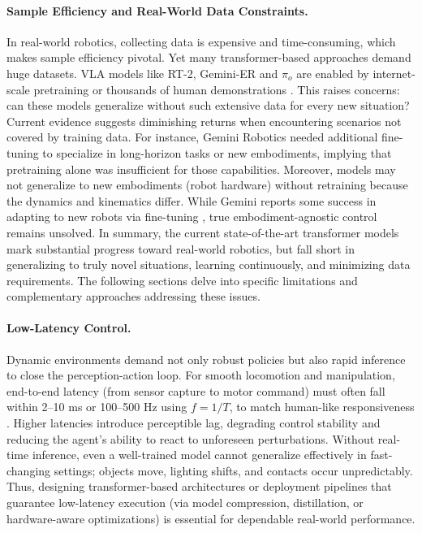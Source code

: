 \paragraph{Sample Efficiency and Real-World Data Constraints.}

In real-world robotics, collecting data is expensive and time-consuming, which makes sample efficiency pivotal. Yet many transformer-based approaches demand huge datasets. \ac{VLA} models like RT-2, Gemini-ER and $\pi_o$ are enabled by internet-scale pretraining or thousands of human demonstrations \cite{RT22023, GEMER2025, PI02024}. This raises concerns: can these models generalize without such extensive data for every new situation? Current evidence suggests diminishing returns when encountering scenarios not covered by training data. For instance, Gemini Robotics needed additional fine-tuning to specialize in long-horizon tasks or new embodiments, implying that pretraining alone was insufficient for those capabilities. Moreover, models may not generalize to new embodiments (robot hardware) without retraining because the dynamics and kinematics differ. While Gemini reports some success in adapting to new robots via fine-tuning \cite{GEMER2025}, true embodiment-agnostic control remains unsolved. In summary, the current state-of-the-art transformer models mark substantial progress toward real-world robotics, but fall short in generalizing to truly novel situations, learning continuously, and minimizing data requirements. The following sections delve into specific limitations and complementary approaches addressing these issues.

\paragraph{Low-Latency Control.}

Dynamic environments demand not only robust policies but also rapid inference to close the perception-action loop. For smooth locomotion and manipulation, end-to-end latency (from sensor capture to motor command) must often fall within 2–10 ms or 100–500 Hz using $f = 1/T$, to match human-like responsiveness \cite{LOCOSURVEY2025}. Higher latencies introduce perceptible lag, degrading control stability and reducing the agent’s ability to react to unforeseen perturbations. Without real-time inference, even a well-trained model cannot generalize effectively in fast-changing settings; objects move, lighting shifts, and contacts occur unpredictably. Thus, designing transformer-based architectures or deployment pipelines that guarantee low-latency execution (via model compression, distillation, or hardware-aware optimizations) is essential for dependable real-world performance.
